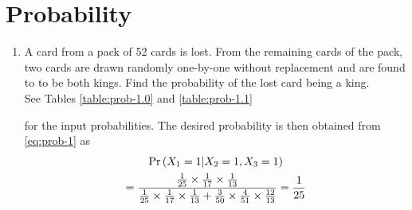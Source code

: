 \documentclass[journal,12pt,twocolumn]{IEEEtran}
\renewcommand\thesection{\arabic{section}}
\begin{document}
 \section{Probability}
\begin{enumerate}[label=\thesection.\arabic*.,ref=\thesection.\theenumi]
\item A card from a pack of 52 cards is lost. From the remaining cards of the pack, two cards are drawn randomly one-by-one without replacement and are found to to be both kings. Find the probability of the lost card being a king.\\
\solution See Tables 
	\eqref{table:prob-1.0}
	and 
	\eqref{table:prob-1.1}
\begin{table}[!htb]
	
\caption{}
	\label{table:prob-1.0}
\end{table}
\begin{table}[!htb]
	
\caption{}
	\label{table:prob-1.1}
\end{table}
for the input probabilities.
The desired probability is then obtained from 
			\eqref{eq:prob-1}
			as
			\begin{multline}
			\Pr\left(X_1 = 1|X_2 = 1, X_3=1\right) 
			\\
				= \frac{\frac{1}{25}\times\frac{1}{17}\times\frac{1}{13} }{\frac{1}{25}\times\frac{1}{17}\times\frac{1}{13} +\frac{3}{50}\times\frac{4}{51}\times\frac{12}{13}   }
				= \frac{1}{25}
			\end{multline}


\end{enumerate}
\end{document}
